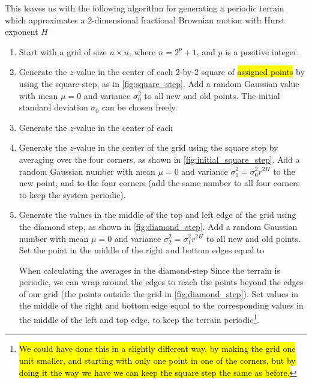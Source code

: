 This leaves us with the following algorithm for generating a periodic terrain which approximates a 2-dimensional fractional Brownian motion with Hurst exponent $H$
\begin{enumerate}
    \item Start with a grid of size $n \times n$, where $n = 2^p + 1$, and $p$ is a positive integer.
    
    \item Generate the $z$-value in the center of each 2-by-2 square of \hl{assigned points} by using the square-step, as in \cref{fig:square_step}. Add a random Gaussian value with mean $\mu = 0$ and variance $\sigma_0^2$ to all new and old points. The initial standard deviation $\sigma_0$ can be chosen freely.
    
    \item Generate the $z$-value in the center of each 
    
    \item Generate the $z$-value in the center of the grid using the square step by averaging over the four corners, as shown in \cref{fig:initial_square_step}. Add a random Gaussian number with mean $\mu = 0$ and variance $\sigma_1^2 = \sigma_0^2r^{2H}$ to the new point, and to the four corners (add the same number to all four corners to keep the system periodic).
    
    \item Generate the values in the middle of the top and left edge of the grid using the diamond step, as shown in \cref{fig:diamond_step}. Add a random Gaussian number with mean $\mu = 0$ and variance $\sigma_2^2 = \sigma_1^2r^{2H}$ to all new and old points. Set the point in the middle of the right and bottom edges equal to 
    
    When calculating the averages in the diamond-step  Since the terrain is periodic, we can wrap around the edges to reach the points beyond the edges of our grid (the points outside the grid in \cref{fig:diamond_step}). Set values in the middle of the right and bottom edge equal to the corresponding values in the middle of the left and top edge, to keep the terrain periodic\footnote{\hl{We could have done this in a slightly different way, by making the grid one unit smaller, and starting with only one point in one of the corners, but by doing it the way we have we can keep the square step the same as before.}}.
    

\end{enumerate}

